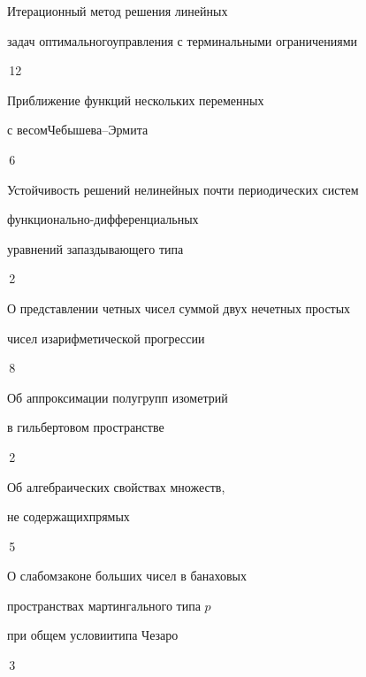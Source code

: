 



{Итерационный метод решения линейных 


задач оптимального\newline управления с терминальными ограничениями}{\No\,12}






{Приближение функций нескольких переменных


с весом\newline Чебышева--Эрмита}{\No\,6}




{Устойчивость решений нелинейных почти периодических систем\newline


функционально-дифференциальных


уравнений запаздывающего типа}{\No\,2}




{О представлении четных чисел суммой двух нечетных простых


чисел из\newline арифметической прогрессии}{\No\,8}




{Об аппроксимации полугрупп изометрий


в гильбертовом пространстве}{\No\,2}




{Об алгебраических свойствах множеств,


не содержащих\newline прямых}{\No\,5}




{О слабом\newline законе больших чисел в банаховых


пространствах мартингального типа $p$ 


при общем условии\newline типа Чезаро}{\No\,3}



